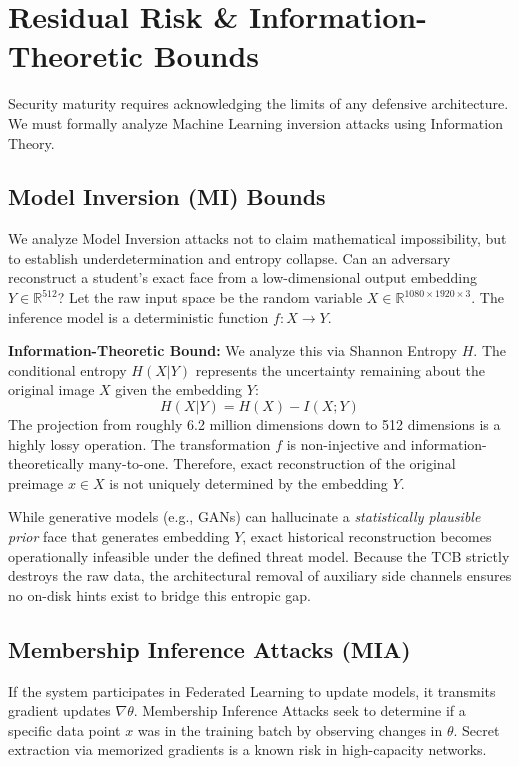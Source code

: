 \documentclass[conference]{IEEEtran}
\begin{document}
\section{Residual Risk \& Information-Theoretic Bounds}
Security maturity requires acknowledging the limits of any defensive architecture. We must formally analyze Machine Learning inversion attacks using Information Theory.

\subsection{Model Inversion (MI) Bounds}
We analyze Model Inversion attacks \cite{b23} not to claim mathematical impossibility, but to establish underdetermination and entropy collapse. Can an adversary reconstruct a student's exact face from a low-dimensional output embedding $Y \in \mathbb{R}^{512}$?
Let the raw input space be the random variable $X \in \mathbb{R}^{1080 \times 1920 \times 3}$.
The inference model is a deterministic function $f: X \to Y$. 

\textbf{Information-Theoretic Bound:} We analyze this via Shannon Entropy $H$. The conditional entropy $H(X | Y)$ represents the uncertainty remaining about the original image $X$ given the embedding $Y$:
\begin{equation}
H(X | Y) = H(X) - I(X;Y)
\end{equation}
The projection from roughly 6.2 million dimensions down to 512 dimensions is a highly lossy operation. The transformation $f$ is non-injective and information-theoretically many-to-one. Therefore, exact reconstruction of the original preimage $x \in X$ is not uniquely determined by the embedding $Y$.

While generative models (e.g., GANs) can hallucinate a \textit{statistically plausible prior} face that generates embedding $Y$, exact historical reconstruction becomes operationally infeasible under the defined threat model. Because the TCB strictly destroys the raw data, the architectural removal of auxiliary side channels ensures no on-disk hints exist to bridge this entropic gap. 

\subsection{Membership Inference Attacks (MIA)}
If the system participates in Federated Learning to update models, it transmits gradient updates $\nabla \theta$. Membership Inference Attacks \cite{b5} seek to determine if a specific data point $x$ was in the training batch by observing changes in $\theta$. Secret extraction via memorized gradients \cite{b21} is a known risk in high-capacity networks.
\end{document}
